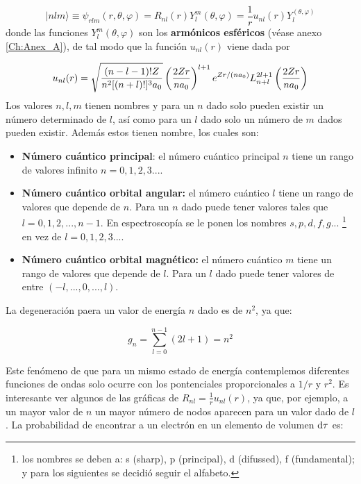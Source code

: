 \begin{equation}
|n l m \rangle \equiv \psi_{rlm} (r,\theta,\varphi) = R_{nl} (r) Y_l^m (\theta,\varphi) = \frac{1}{r} u_{nl} (r) Y_l^ (\theta,\varphi)
\end{equation}
donde las funciones $Y_l^m (\theta,\varphi)$ son los \textbf{armónicos esféricos} (véase anexo \ref{Ch:Anex_A}), de tal modo que la función $u_{nl} (r)$ viene dada por

\begin{equation}
    u_{nl} (r) = \sqrt{\frac{(n-l-1)! Z}{n^2 [(n+l)!]^3a_0}} \left( \frac{2Zr}{na_0} \right)^{l+1} e^{Zr/(na_0)} L_{n+l}^{2l+1} \left( \frac{2Zr}{na_0} \right)
\end{equation}
Los valores $n,l,m$ tienen nombres y para un $n$ dado solo pueden existir un número determinado de $l$, así como para un $l$ dado solo un número de $m$ dados pueden existir. Además estos tienen nombre, los cuales son:

\begin{itemize}
    \item \textbf{Número cuántico principal}: el número cuántico principal $n$ tiene un rango de valores infinito $n=0,1,2,3...$. 
    \item \textbf{Número cuántico orbital angular:} el número cuántico $l$ tiene un rango de valores que depende de $n$. Para un $n$ dado puede tener valores tales que $l=0,1,2,...,n-1$. En espectroscopía se le ponen los nombres $s,p,d,f,g...$ \footnote{los nombres se deben a: s (sharp), p (principal), d (difussed), f (fundamental); y para los siguientes se decidió seguir el alfabeto.} en vez de $l=0,1,2,3...$.
    \item \textbf{Número cuántico orbital magnético:} el número cuántico $m$ tiene un rango de valores que depende de $l$. Para un $l$ dado puede tener valores de entre $(-l,...,0,...,l)$.
\end{itemize}
La degeneración paera un valor de energía $n$ dado es de $n^2$, ya que:

\begin{equation}    
    g_n = \sum_{l=0}^{n-1} (2l+1) = n^2
\end{equation}

Este fenómeno de que para un mismo estado de energía contemplemos diferentes funciones de ondas solo ocurre con los pontenciales proporcionales a $1/r$ y $r^2$. Es interesante ver algunos de las gráficas de $R_{nl} = \frac{1}{r} u_{nl} (r)$, ya que, por ejemplo, a un mayor valor de $n$ un mayor número de nodos aparecen para un valor dado de $l$. La probabilidad de encontrar a un electrón en un elemento de volumen $\mathrm{d} \tau$ es:


